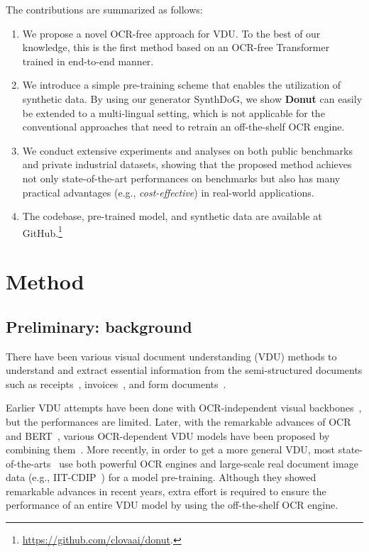 \documentclass[runningheads]{llncs}
\newcommand\oursb{{\textbf{\mbox{Donut}}}\xspace}
\begin{document}
The contributions are summarized as follows:
\begin{enumerate}
\item[1.] We propose a novel OCR-free approach for VDU. To the best of our knowledge, this is the first method based on an OCR-free Transformer trained in end-to-end manner.
\item[2.] We introduce a simple pre-training scheme that enables the utilization of synthetic data. By using our generator {SynthDoG}, we show \oursb can easily be extended to a multi-lingual setting, which is not applicable for the conventional approaches that need to retrain an off-the-shelf OCR engine. 
\item[3.] We conduct extensive experiments and analyses on both public benchmarks and private industrial datasets, showing that the proposed method achieves not only state-of-the-art performances on benchmarks but also has many practical advantages (e.g., \textit{cost-effective}) in real-world applications. 
\item[4.] The codebase, pre-trained model, and synthetic data are available at GitHub.\footnote{\url{https://github.com/clovaai/donut}\label{footnote_code}.}
\end{enumerate}


 
\section{Method}
\subsection{Preliminary: background}
There have been various visual document understanding (VDU) methods to understand and extract essential information from the semi-structured documents such as receipts~\cite{8977955,hwang-etal-2021-spatial,hong2021bros}, invoices~\cite{8978079}, and form documents~\cite{7333829,8977962,majumder-etal-2020-representation}. 

Earlier VDU attempts have been done with OCR-independent visual backbones~\cite{Kang2014ConvolutionalNN,7333933,7333910,eaten,docreader}, but the performances are limited. Later, with the remarkable advances of OCR~\cite{baek2019craft,baek2019wrong} and BERT~\cite{devlinBERT2018}, various OCR-dependent VDU models have been proposed by combining them~\cite{hwang2019pot,hwang2020spade,hwang2021costeffective}. More recently, in order to get a more general VDU, most state-of-the-arts~\cite{xu-etal-2021-layoutlmv2,hong2021bros} use both powerful OCR engines and large-scale real document image data (e.g., IIT-CDIP~\cite{iitcdip}) for a model pre-training.
Although they showed remarkable advances in recent years, extra effort is required to ensure the performance of an entire VDU model by using the off-the-shelf OCR engine.
 
\end{document}
